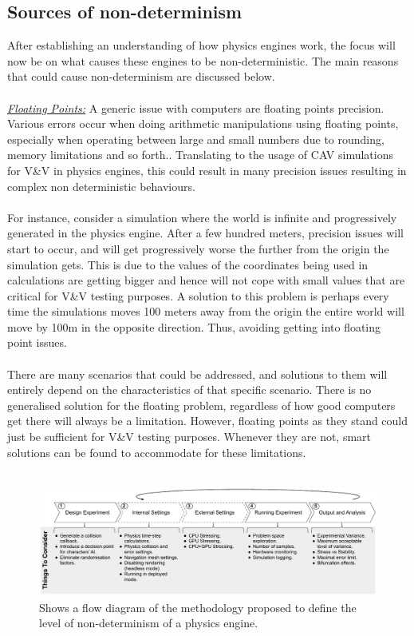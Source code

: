 \subsection{Sources of non-determinism}\label{nondeterminisimSources}
\noindent After establishing an understanding of how physics engines work, the focus will now be on what causes these engines to be non-deterministic. 
The main reasons that could cause non-determinism are discussed below. \\\\
\noindent\underline{\textit{Floating Points:}}
A generic issue with computers are floating points precision. 
Various errors occur when doing arithmetic manipulations using floating points, especially when operating between large and small numbers due to rounding, memory limitations and so forth.\cite{FloatingPointArithmeticArticle}\cite{FloatingPointsBook}. 
Translating to the usage of CAV simulations for V\&V in physics engines, this could result in many precision issues resulting in complex non deterministic behaviours.\\\\ 
\noindent For instance, consider a simulation where the world is infinite and progressively  generated in the physics engine. 
After a few hundred meters, precision issues will start to occur, and will get progressively worse the further from the origin the simulation gets. 
This is due to the values of the coordinates being used in calculations are getting bigger and hence will not cope with small values that are critical for V\&V testing purposes. 
A solution to this problem is perhaps every time the simulations moves 100 meters away from the origin the entire world will move by 100m in the opposite direction. Thus, avoiding getting into floating point issues.\cite{FloatingPointArithmeticArticle}\\\\
\noindent There are many scenarios that could be addressed, and solutions to them will entirely depend on the characteristics of that specific scenario. There is no generalised solution for the floating problem, regardless of how good computers get there will always be a limitation. However, floating points as they stand could just be sufficient for V\&V testing purposes. Whenever they are not, smart solutions can be found to accommodate for these limitations.\\\\
\begin{figure}[b]
    \centering
    \includegraphics[width=0.99\linewidth]{Other/Figures/MethodologyDiagramCropped.pdf}
    \caption{Shows a flow diagram of the methodology proposed to define the level of non-determinism of a physics engine.}

    \label{method_diagram}
\end{figure}
